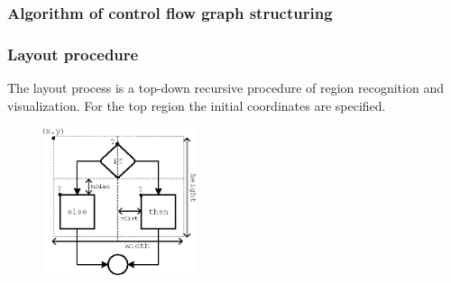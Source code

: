 \documentclass[aspectratio=169]{beamer}
\begin{document}

\begin{frame}
\frametitle{Algorithm of control flow graph structuring}
\small{%
\begin{algorithm}[H]
\SetAlgoLined %
\end{algorithm}%
}
\end{frame}


\begin{frame}
\frametitle{Layout procedure}

The layout process is a top-down recursive procedure of region recognition and visualization.  For the top region the initial coordinates are specified.

\begin{figure}[htbp]
	\centering
		\includegraphics[width=0.4\textwidth]{Pic/IfThenElse.eps}
	\label{fig:IfThenElse}
\end{figure}

\end{frame}
\end{document}
